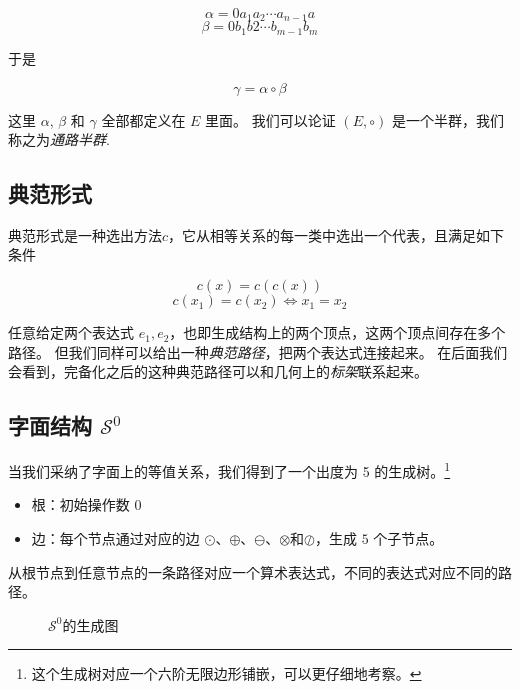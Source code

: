 \documentclass[a4paper,12pt]{article}
\numberwithin{definition}{section}
\numberwithin{lemma}{section}
\numberwithin{proposition}{section}
\numberwithin{theorem}{section}
\numberwithin{grammar}{section}
\numberwithin{program}{section}
\numberwithin{convention}{section}
\numberwithin{corollary}{section}
\begin{document}
$$\alpha = 0 a_1 a_2 \cdots a_{n-1} a$$
$$\beta = 0 b_1 b2 \cdots b_{m-1} b_m$$

于是

$$\gamma = \alpha \circ \beta$$

这里 $\alpha$, $\beta$ 和 $\gamma$ 全部都定义在 $E$ 里面。 我们可以论证 $(E, \circ)$ 是一个半群，我们称之为\emph{通路半群}.

\subsection{典范形式}\label{subsec:canonical}

典范形式是一种选出方法$c$，它从相等关系的每一类中选出一个代表，且满足如下条件

$$  c(x) = c(c(x)) $$
$$  c(x_1) = c(x_2) \iff x_1 = x_2  $$

任意给定两个表达式 $e_1, e_2$，也即生成结构上的两个顶点，这两个顶点间存在多个路径。
但我们同样可以给出一种\emph{典范路径}，把两个表达式连接起来。
在后面我们会看到，完备化之后的这种典范路径可以和几何上的\emph{标架}联系起来。

\subsection{字面结构 $\mathcal{S}^0$}\label{subsec:literial}

当我们采纳了字面上的等值关系，我们得到了一个出度为 5 的生成树。\footnote[2]{这个生成树对应一个六阶无限边形铺嵌，可以更仔细地考察。}

\begin{itemize}
    \item 根：初始操作数 $0$
    \item 边：每个节点通过对应的边 $\odot$、$\oplus$、$\ominus$、$\otimes$和$\oslash$，生成 $5$ 个子节点。
\end{itemize}

从根节点到任意节点的一条路径对应一个算术表达式，不同的表达式对应不同的路径。

\begin{figure}[ht]
\centering
{}
\caption{$\mathcal{S}^0$的生成图}
\end{figure}
\end{document}
